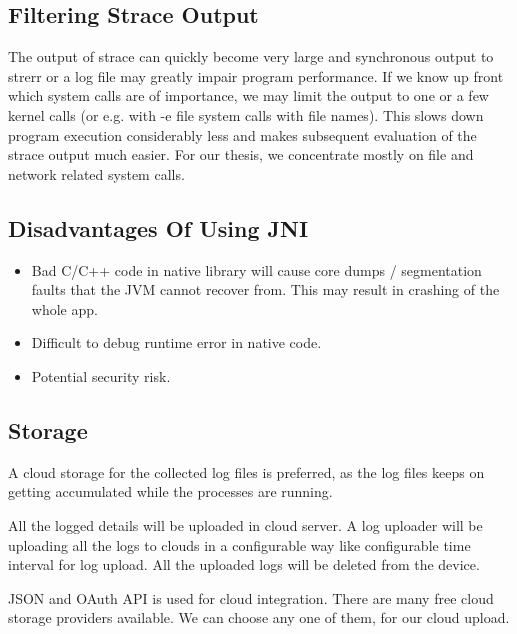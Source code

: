 \subsection{Filtering Strace Output}
The output of
strace
can quickly become very large and synchronous output to
strerr
or a log file may
greatly impair program performance. If we know up front which system calls are of importance, we
may limit the output to one or a few kernel calls (or e.g. with
-e file
system calls with file names). This
slows down program execution considerably less and makes subsequent evaluation of the
strace	output	much easier. For our thesis, we concentrate mostly on file and network related system calls.

\subsection{Disadvantages Of Using JNI}
\begin{itemize}
	\item Bad C/C++ code in native library will cause core dumps / segmentation faults that the JVM cannot recover from. This may result in crashing of the whole app.
	\item Difficult to debug runtime error in native code.
	\item Potential security risk.
\end{itemize}

\subsection{Storage}
A cloud storage for the collected log files is preferred, as the log files keeps on getting accumulated while the processes are running.

All the logged details will be uploaded in cloud server. A log uploader will be uploading all the logs to clouds in a configurable way like configurable time interval for log upload. All the uploaded logs will be deleted from the device.

JSON and OAuth API is used for cloud integration. There are many free cloud storage providers available. We can choose any one of them, for our cloud upload.
